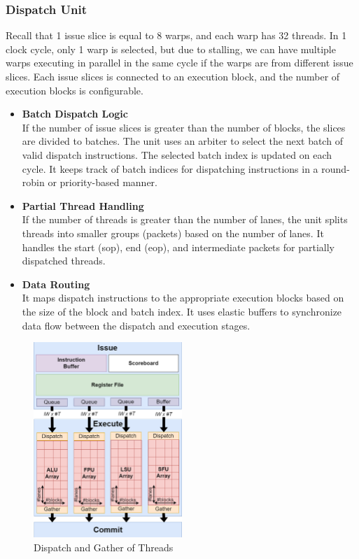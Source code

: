 \documentclass[12pt]{report}
\begin{document}
\subsubsection{Dispatch Unit}
Recall that 1 issue slice is equal to 8 warps, and each warp has 32 threads. In 1 clock cycle, only 1 warp is selected, but due to stalling, we can have multiple warps executing in parallel in the same cycle if the warps are from different issue slices. Each issue slices is connected to an execution block, and the number of execution blocks is configurable.
\begin{itemize}
    \item \textbf{Batch Dispatch Logic} \\
    If the number of issue slices is greater than the number of blocks, the slices are divided to batches. The unit uses an arbiter to select the next batch of valid dispatch instructions. The selected batch index is updated on each cycle. It keeps track of batch indices for dispatching instructions in a round-robin or priority-based manner.

    \item \textbf{Partial Thread Handling} \\
    If the number of threads is greater than the number of lanes, the unit splits threads into smaller groups (packets) based on the number of lanes. It handles the start (sop), end (eop), and intermediate packets for partially dispatched threads.

    \item \textbf{Data Routing} \\ 
    It maps dispatch instructions to the appropriate execution blocks based on the size of the block and batch index. It uses elastic buffers to synchronize data flow between the dispatch and execution stages.
\end{itemize}
\begin{figure}[H]
    \centering
    \includegraphics[width=0.5\textwidth]{./figures/dispatch.png}
    \caption{Dispatch and Gather of Threads}
\end{figure}
\end{document}
